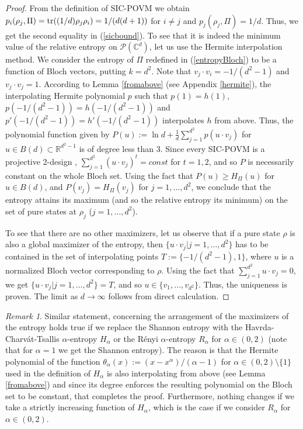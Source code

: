 \documentclass[11pt]{article}
\theoremstyle{remark}
\newtheorem{R}{Remark}
\theoremstyle{definition}
\def\tr{\textnormal{tr}}
\begin{document}
\begin{proof}
	From the definition of SIC-POVM we obtain $p_i(\rho_j,\Pi)=\tr((1/d)\rho_j\rho_i)= 1/(d(d+1))$ for $i\neq j$ and $p_j(\rho_j,\Pi)=1/d$. Thus, we get the second equality in (\ref{sicbound}). To see that it is indeed the minimum value of the relative entropy on $\mathcal P(\mathbb C^d)$, let us use the Hermite interpolation method. We consider the entropy of $\Pi$ redefined in (\ref{entropyBloch}) 
	to be a function of Bloch vectors, putting $k=d^2$. Note that $v_j\cdot v_i=-1/(d^2-1)$ and $v_j\cdot v_j=1$. 
	According to Lemma \ref{fromabove} (see Appendix \ref{hermite}), the interpolating Hermite polynomial $p$ such that $p(1)=h(1)$, $p(-1/(d^2-1))= h(-1/(d^2-1))$ and $p'(-1/(d^2-1))=h'(-1/(d^2-1))$   interpolates $h$ from above.
	Thus, the polynomial function given by $P(u):=\ln d+\frac{1}{d}\sum_{j=1}^{d^2}p(u\cdot v_j)$ for $u\in B(d)\subset\mathbb R^{d^2-1}$ is of degree less than 3. Since every SIC-POVM is a projective 2-design \cite{Renetal04}, $\sum_{j=1}^{d^2}(u\cdot v_j)^t=const$ for $t=1,2$, and so $P$ is necessarily constant on the whole Bloch set. Using the fact that $P(u)\geq H_{\Pi}(u)$ for $u\in B(d)$, and $P(v_j)=H_\Pi(v_j)$ for $j=1,\ldots,d^2$, we conclude that the entropy attains its maximum (and so the relative entropy its minimum) on the set of pure states  at $\rho_j$ ($j=1,\ldots,d^2$).
	
	To see that there are no other maximizers, let us observe that 
	if a pure state $\rho$ is also a global maximizer of the entropy, then $\{u\cdot v_j|j=1,\ldots,d^2\}$ has to be contained in the set of interpolating points $T:=\{-1/(d^2-1),1\}$, where $u$ is a normalized Bloch vector corresponding to $\rho$. Using the fact that $\sum_{j=1}^{d^2}u\cdot v_j=0$, we get $\{u\cdot v_j|j=1,\ldots,d^2\}= T$, and so $u\in\{v_1,\ldots,v_{d^2}\}$. Thus, the uniqueness is proven. The limit as $d\to\infty$ follows from direct calculation.
\end{proof}

\begin{R}\label{genentr} 
	Similar statement, concerning the arrangement of the maximizers of the entropy holds true if we replace the Shannon entropy with the Havrda-Charv\'at-Tsallis $\alpha$-entropy $H_\alpha$ or the R\'enyi $\alpha$-entropy $R_\alpha$ for $\alpha\in (0,2)$ (note that for $\alpha=1$ we get the Shannon entropy). The reason is that the Hermite polynomial of the function $\theta_\alpha(x):=(x-x^\alpha)/(\alpha-1)$ for $\alpha\in(0,2)\setminus\{1\}$ used in the definition of $H_\alpha$ is also interpolating from above (see Lemma \ref{fromabove}) and since its degree enforces the resulting polynomial on the Bloch set to be constant, that completes the proof. Furthermore, nothing changes if we take a strictly increasing function of $H_\alpha$, which is the case if we consider $R_\alpha$ for $\alpha\in (0,2)$.
\end{R}
\end{document}
